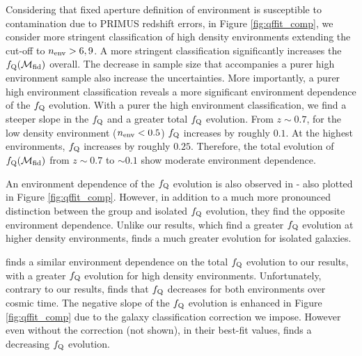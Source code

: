 \documentclass{emulateapj}
\begin{document}
Considering that fixed aperture definition of environment is susceptible to contamination due to PRIMUS redshift errors, in Figure \ref{fig:qffit_comp}, we consider more stringent classification of high density environments extending the cut-off to $n_{\rm{env}} > 6, 9$. A more stringent classification significantly increases the $f_{\rm{Q}}(\mathcal{M}_{\rm{fid}})$ overall. The decrease in sample size that accompanies a purer high environment sample also increase the uncertainties. More importantly, a purer high environment classification reveals a more significant environment dependence of the $f_{\rm{Q}}$ evolution. With a purer the high environment classification, we find a steeper slope in the $f_{\rm{Q}}$ and a greater total $f_{\rm{Q}}$ evolution. From $ z \sim 0.7$, for the low density environment ($n_{\rm{env}} < 0.5$) $f_{\rm{Q}}$ increases by roughly $0.1$. At the highest environments, $f_{\rm{Q}}$ increases by roughly $0.25$. Therefore, the total evolution of $f_{\rm{Q}}(\mathcal{M}_{\rm{fid}})$ from $z \sim 0.7$ to $\sim 0.1$ show moderate environment dependence.

An environment dependence of the $f_{\rm{Q}}$ evolution is also observed in \cite{Iovino:2010aa} - also plotted in Figure \ref{fig:qffit_comp}. However, in addition to a much more pronounced distinction between the group and isolated $f_{\rm{Q}}$ evolution, they find the opposite environment dependence. Unlike our results, which find a greater $f_{\rm{Q}}$ evolution at higher density environments, \cite{Iovino:2010aa} finds a much greater evolution for isolated galaxies. 

\cite{Kovac:2014aa} finds a similar environment dependence on the total $f_{\rm{Q}}$ evolution to our results, with a greater $f_{\rm{Q}}$ evolution for high density environments. Unfortunately, contrary to our results, \cite{Kovac:2014aa} finds that $f_{\rm{Q}}$ decreases for both environments over cosmic time. The negative slope of the $f_{\rm{Q}}$ evolution is enhanced in Figure \ref{fig:qffit_comp} due to the galaxy classification correction we impose. However even without the correction (not shown), in their best-fit values, \cite{Kovac:2014aa} finds a decreasing $f_{\rm{Q}}$ evolution. 
\end{document}
